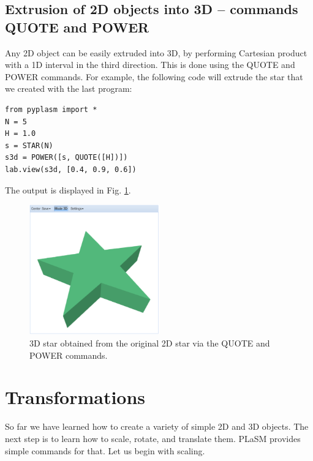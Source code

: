 \documentclass[article,A4,12pt]{llncs}
\begin{document}
\subsection{Extrusion of 2D objects into 3D -- commands QUOTE and POWER}

Any 2D object can be easily extruded into 3D, by performing 
Cartesian product with a 1D interval in the third direction. This is done using the 
QUOTE and POWER commands. For example, the following code will
extrude the star that we created with the last program:

\begin{verbatim}
from pyplasm import *
N = 5
H = 1.0
s = STAR(N)
s3d = POWER([s, QUOTE([H])])
lab.view(s3d, [0.4, 0.9, 0.6])
\end{verbatim}
The output is displayed in Fig. \ref{fig:star-2}.

\newpage

\begin{figure}[!ht]
\begin{center}
\includegraphics[width=0.5\textwidth]{img/star-2.png}
\end{center}
\vspace{-2mm}
\caption{3D star obtained from the original 2D star via the QUOTE and POWER commands.}
\label{fig:star-2}
\end{figure}

\section{Transformations}

So far we have learned how to create a variety of simple 2D and 3D objects. 
The next step is to learn how to scale, rotate, and translate them. PLaSM
provides simple commands for that. Let us begin with scaling.
\end{document}
